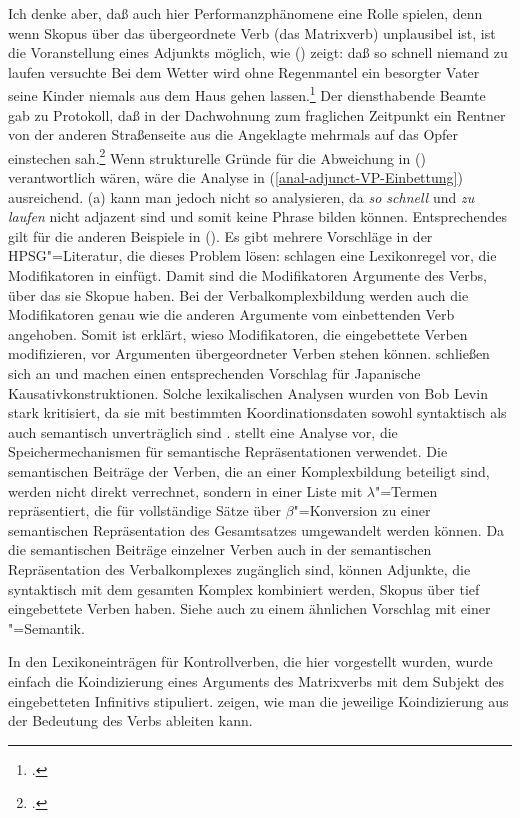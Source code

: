 {Ich denke aber, daß auch hier Performanzphänomene eine Rolle spielen, denn wenn Skopus
über das übergeordnete Verb (das Matrixverb) unplausibel ist, ist die Voranstellung eines Adjunkts möglich, wie
() zeigt:
\eal
\ex daß so schnell niemand zu laufen versuchte
\ex Bei dem Wetter wird ohne Regenmantel ein besorgter Vater seine Kinder niemals aus dem Haus gehen lassen.\footnote{
.
}
\ex Der diensthabende Beamte gab zu Protokoll, daß in der Dachwohnung zum fraglichen Zeitpunkt ein Rentner von der
    anderen Straßenseite aus die Angeklagte mehrmals auf das Opfer einstechen sah.\footnote{
.
}
\zl
Wenn strukturelle Gründe für die Abweichung in () verantwortlich wären, wäre die Analyse in
(\ref{anal-adjunct-VP-Einbettung}) ausreichend. (a) kann man jedoch nicht so analysieren, da
\emph{so schnell} und \emph{zu laufen} nicht adjazent sind und somit keine Phrase bilden
können. Entsprechendes gilt für die anderen Beispiele in (). Es
gibt mehrere Vorschläge in der HPSG"=Literatur, die dieses Problem lösen: \citet{NB94} schlagen eine
Lexikonregel vor, die Modifikatoren in \subcatln einfügt. Damit sind die Modifikatoren Argumente des
Verbs, über das sie Skopue haben. Bei der Verbalkomplexbildung werden auch die Modifikatoren genau wie die
anderen Argumente vom einbettenden Verb angehoben. Somit ist erklärt, wieso Modifikatoren, die
eingebettete Verben modifizieren, vor Argumenten übergeordneter Verben stehen können. \citet*{MSI99a}
schließen sich \citet{NB94} an und machen einen entsprechenden Vorschlag für
Japanische Kausativkonstruktionen. Solche lexikalischen
Analysen wurden von Bob Levin stark kritisiert, da sie mit bestimmten Koordinationsdaten sowohl
syntaktisch als auch semantisch unverträglich sind
\citep{Levine2003a,LH2006a}. \citet[Abschnitt~6]{Cipollone2001a} stellt eine Analyse vor, die
Speichermechanismen für semantische Repräsentationen verwendet. Die semantischen Beiträge der
Verben, die an einer Komplexbildung beteiligt sind, werden nicht direkt verrechnet, sondern in einer
Liste mit $\lambda$"=Termen repräsentiert, die für vollständige Sätze über $\beta$"=Konversion zu
einer semantischen Repräsentation des Gesamtsatzes umgewandelt werden können. Da die semantischen
Beiträge einzelner Verben auch in der semantischen Repräsentation des Verbalkomplexes zugänglich
sind, können Adjunkte, die syntaktisch mit dem gesamten Komplex kombiniert werden, Skopus über tief
eingebettete Verben haben. Siehe auch \citet{Crysmann2004a} zu einem ähnlichen Vorschlag mit einer \mrs"=Semantik.

In den Lexikoneinträgen für Kontrollverben, die hier vorgestellt wurden, wurde einfach die
Koindizierung eines Arguments des Matrixverbs mit dem Subjekt des eingebetteten Infinitivs
stipuliert. \citet[Kapitel~7]{ps2} zeigen, wie man die jeweilige Koindizierung aus der Bedeutung
des Verbs ableiten kann.
%
}%
